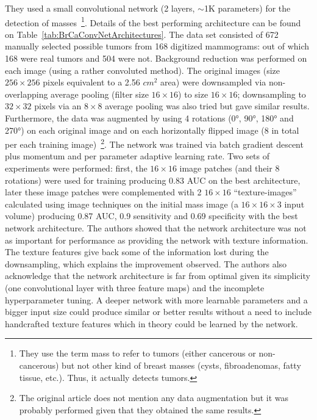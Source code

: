 They used a small convolutional network (2 layers, $\sim$1K parameters) for the detection of masses~\footnote{They use the term mass to refer to tumors (either cancerous or non-cancerous) but not other kind of breast masses (cysts, fibroadenomas, fatty tissue, etc.). Thus, it actually detects tumors.}. Details of the best performing architecture can be found on Table~\ref{tab:BrCaConvNetArchitectures}. The data set consisted of 672 manually selected possible tumors from 168 digitized mammograms: out of which 168 were real tumors and 504 were not. Background reduction was performed on each image (using a rather convoluted method). The original images (size $256 \times 256$ pixels equivalent to a 2.56 $cm^2$ area) were downsampled via non-overlapping average pooling (filter size $16 \times 16$) to size $16\times 16$; downsampling to $32 \times 32$ pixels via an $8 \times 8$ average pooling was also tried but gave similar results. Furthermore, the data was augmented by using 4 rotations (0°, 90°, 180° and 270°) on each original image and on each horizontally flipped image (8 in total per each training image)~\footnote{The original article does not mention any data augmentation but it was probably performed given that they obtained the same results.}. The network was trained via batch gradient descent plus momentum and per parameter adaptive learning rate. Two sets of experiments were performed: first, the $16 \times 16$ image patches (and their 8 rotations) were used for training producing 0.83 AUC on the best architecture, later these image patches were complemented with 2 $16 \times 16$ ``texture-images'' calculated using image techniques on the initial mass image (a $16\times 16 \times 3$ input volume) producing 0.87 AUC, 0.9 sensitivity and 0.69 specificity with the best network architecture. The authors showed that the network architecture was not as important for performance as providing the network with texture information. The texture features give back some of the information lost during the downsampling, which explains the improvement observed. The authors also acknowledge that the network architecture is far from optimal given its simplicity (one convolutional layer with three feature maps) and the incomplete hyperparameter tuning. A deeper network with more learnable parameters and a bigger input size could produce similar or better results without a need to include handcrafted texture features which in theory could be learned by the network.



